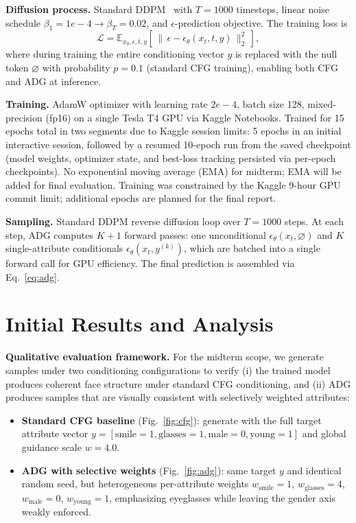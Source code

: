 \documentclass{article}
\begin{document}
\textbf{Diffusion process.} Standard DDPM~\citep{ho2020ddpm} with $T{=}1000$ timesteps, linear noise schedule $\beta_1{=}1e{-}4 \to \beta_T{=}0.02$, and $\epsilon$-prediction objective. The training loss is
\begin{equation}
\mathcal{L} = \mathbb{E}_{x_0, \epsilon, t, y}\!\left[\,\bigl\|\,\epsilon - \epsilon_\theta(x_t, t, y)\,\bigr\|_2^2\,\right],
\end{equation}
where during training the entire conditioning vector $y$ is replaced with the null token $\varnothing$ with probability $p{=}0.1$ (standard CFG training), enabling both CFG and ADG at inference.

\textbf{Training.} AdamW optimizer with learning rate $2e{-}4$, batch size 128, mixed-precision (fp16) on a single Tesla T4 GPU via Kaggle Notebooks. Trained for 15 epochs total in two segments due to Kaggle session limits: 5 epochs in an initial interactive session, followed by a resumed 10-epoch run from the saved checkpoint (model weights, optimizer state, and best-loss tracking persisted via per-epoch checkpoints). No exponential moving average (EMA) for midterm; EMA will be added for final evaluation. Training was constrained by the Kaggle 9-hour GPU commit limit; additional epochs are planned for the final report.

\textbf{Sampling.} Standard DDPM reverse diffusion loop over $T{=}1000$ steps. At each step, ADG computes $K{+}1$ forward passes: one unconditional $\epsilon_\theta(x_t, \varnothing)$ and $K$ single-attribute conditionals $\epsilon_\theta(x_t, y^{(k)})$, which are batched into a single forward call for GPU efficiency. The final prediction is assembled via Eq.~\eqref{eq:adg}.

\section{Initial Results and Analysis}
\label{sec:results}

\textbf{Qualitative evaluation framework.} For the midterm scope, we generate samples under two conditioning configurations to verify (i) the trained model produces coherent face structure under standard CFG conditioning, and (ii) ADG produces samples that are visually consistent with selectively weighted attributes:
\begin{itemize}
\item \textbf{Standard CFG baseline} (Fig.~\ref{fig:cfg}): generate with the full target attribute vector $y = [\text{smile}{=}1, \text{glasses}{=}1, \text{male}{=}0, \text{young}{=}1]$ and global guidance scale $w{=}4.0$.
\item \textbf{ADG with selective weights} (Fig.~\ref{fig:adg}): same target $y$ and identical random seed, but heterogeneous per-attribute weights $w_{\text{smile}}{=}1$, $w_{\text{glasses}}{=}4$, $w_{\text{male}}{=}0$, $w_{\text{young}}{=}1$, emphasizing eyeglasses while leaving the gender axis weakly enforced.
\end{itemize}
\end{document}
